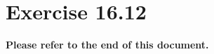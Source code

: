\documentclass{article}
\begin{document}
\section{Exercise 16.12}
\textbf{Please refer to the end of this document.}




\end{document}
